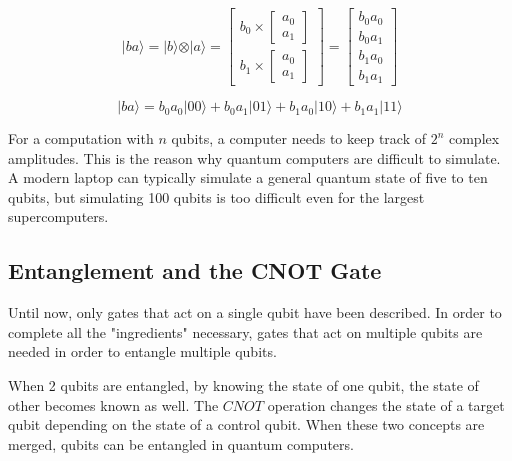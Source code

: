 \begin{linenomath}
\begin{equation}
\vert ba \rangle = \vert b \rangle \otimes \vert a \rangle = \begin{bmatrix}
b_0 \times \begin{bmatrix} a_0 \\ a_1 \end{bmatrix} \\
b_1 \times \begin{bmatrix} a_0 \\ a_1 \end{bmatrix}
\end{bmatrix} = \begin{bmatrix} b_0 a_0 \\ b_0 a_1 \\ b_1 a_0 \\ b_1 a_1 \end{bmatrix} 
\label{eq:kron1}
\end{equation}
\end{linenomath}
\begin{linenomath}
\begin{equation}
\vert ba \rangle = b_0a_0\vert 00 \rangle + b_0a_1\vert 01 \rangle + b_1a_0\vert 10 \rangle + b_1a_1\vert 11 \rangle
\label{eq:kron2}
\end{equation}
\end{linenomath}

For a computation with $n$ qubits, a computer needs to keep track of $2^n$
complex amplitudes. This is the reason why quantum computers are difficult to 
simulate. A modern laptop can typically simulate a general quantum state of five
to ten qubits, but simulating 100 qubits is too difficult even for the largest 
supercomputers.

\subsection{Entanglement and the CNOT Gate}
\label{sec:cnot}

Until now, only gates that act on a single qubit have been described. In order
to complete all the "ingredients" necessary, gates that act on multiple qubits
are needed in order to entangle multiple qubits.

When 2 qubits are entangled, by knowing the state of one qubit, the state of 
other becomes known as well. The $CNOT$ operation changes the state of a target
qubit depending on the state of a control qubit. When these two concepts are 
merged, qubits can be entangled in quantum computers.


